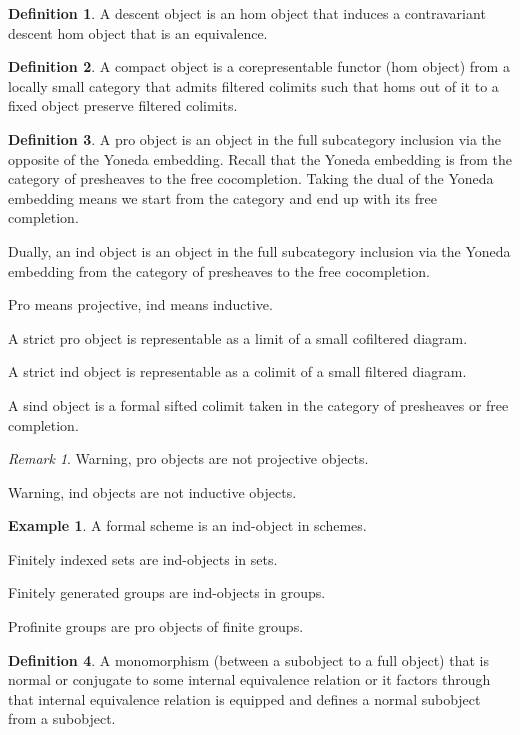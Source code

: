 \documentclass[10pt]{article}
\theoremstyle{plain}%
\theoremstyle{definition}
\newtheorem{definition}{Definition}[section]
\newtheorem{example}{Example}[section]
\theoremstyle{remark}
\newtheorem*{remark}{Remark}
\begin{document}
\begin{definition}
    A descent object is an hom object that induces a contravariant descent hom object that is an equivalence.
\end{definition}

\begin{definition}
    A compact object is a corepresentable functor (hom object) from a locally small category that admits filtered colimits such that homs out of it to a fixed object preserve filtered colimits.
\end{definition}

\begin{definition}
    A pro object is an object in the full subcategory inclusion via the opposite of the Yoneda embedding. Recall that the Yoneda embedding is from the category of presheaves to the free cocompletion. Taking the dual of the Yoneda embedding means we start from the category and end up with its free completion.

    Dually, an ind object is an object in the full subcategory inclusion via the Yoneda embedding from the category of presheaves to the free cocompletion.

    Pro means projective, ind means inductive.

    A strict pro object is representable as a limit of a small cofiltered diagram.

    A strict ind object is representable as a colimit of a small filtered diagram.

    A sind object is a formal sifted colimit taken in the category of presheaves or free completion.
\end{definition}

\begin{remark}
    Warning, pro objects are not projective objects.

    Warning, ind objects are not inductive objects.
\end{remark}

\begin{example}
    A formal scheme is an ind-object in schemes.

    Finitely indexed sets are ind-objects in sets.

    Finitely generated groups are ind-objects in groups.

    Profinite groups are pro objects of finite groups.
\end{example}

\begin{definition}
    A monomorphism (between a subobject to a full object) that is normal or conjugate to some internal equivalence relation or it factors through that internal equivalence relation is equipped and defines a normal subobject from a subobject.
\end{definition}
\end{document}
